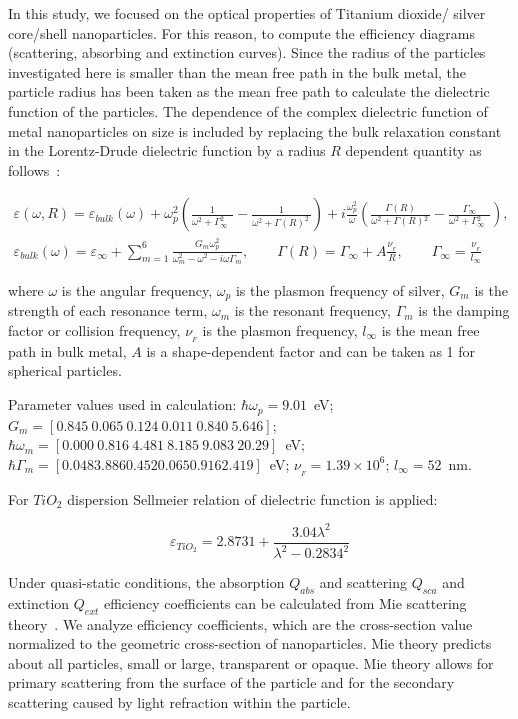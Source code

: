 \documentclass[aip,jap,reprint]{revtex4-1}
\begin{document}
In this study, we focused on the optical properties of Titanium
dioxide/ silver core/shell nanoparticles. For this reason, to compute
the efficiency diagrams (scattering, absorbing and extinction curves).
Since the radius of the particles investigated here is smaller than
the mean free path in the bulk metal, the particle radius has been
taken as the mean free path to calculate the dielectric function of
the particles. The dependence of the complex dielectric function of
metal nanoparticles on size is included by replacing the bulk
relaxation constant in the Lorentz-Drude dielectric function by a
radius $R$ dependent quantity as follows~\cite{Kreibig-1995,Rakic-1998}:
\begin{widetext}
\begin{align*}
\varepsilon(\omega,R) = \varepsilon_{bulk}(\omega) 
+ \omega^2_p
\left(
  \frac{1}{\omega^2 +{\Gamma}^2_{\infty\phantom{A}}} -
  \frac{1}{\omega^2 +\Gamma(R)^{2}_{\phantom{A}}} 
\right)
+ i \frac{\omega^2_p}{\omega}
\left (
  \frac{\Gamma(R)}{\omega^2+\Gamma(R){^2_{\phantom{A}}}}
  - \frac{\Gamma_\infty}{\omega^2+\Gamma{^{2}_{\infty\phantom{A}}}}
\right) ,\\ 
\varepsilon_{bulk}(\omega) = \varepsilon_\infty 
+ \sum^6_{m=1} \frac{G_m \omega^2_p}{\omega_m^2 - \omega^2 -i \omega
  \Gamma_m} , \qquad
  \Gamma(R) = \Gamma_\infty + A\frac{\nu_{\! _F}}{R}, \qquad
  \Gamma_\infty = \frac{\nu_{\! _F}}{l_\infty}
\end{align*}
\end{widetext}
where $\omega$
is the angular frequency, $\omega_p$
is the plasmon frequency of silver, $G_m$
is the strength of each resonance term, $\omega_m$
is the resonant frequency, $\Gamma_m$
is the damping factor or collision frequency, $\nu_{\! _F}$
is the plasmon frequency, $l_\infty$
is the mean free path in bulk metal, $A$
is a shape-dependent factor and can be taken as 1 for spherical
particles.

Parameter values used in calculation: $\hbar\omega_p = 9.01$~eV;
$G_m = [0.845\ 0.065\ 0.124\ 0.011\ 0.840\ 5.646]$; 
$\hbar\omega_m = [0.000\ 0.816\ 4.481\ 8.185\ 9.083\ 20.29]$~eV;
$\hbar\Gamma_m = [0.048 3.886 0.452 0.065 0.916 2.419]$~eV;
$\nu_{\! _F} = 1.39 \times 10^6$; $l_\infty = 52$~nm.

For $TiO_2$ dispersion Sellmeier relation of dielectric function is
applied: 

$$
\varepsilon_{TiO_2} = 2.8731 + \frac{3.04\lambda^2}{\lambda^2-0.2834^2}
$$

Under quasi-static conditions, the absorption $Q_{abs}$ and scattering $Q_{sca}$
and extinction $Q_{ext}$ efficiency coefficients can be calculated from Mie
scattering theory~\cite{Hulst-1957}. We analyze efficiency coefficients, which are
the cross-section value normalized to the geometric cross-section of
nanoparticles. Mie theory predicts about all particles, small or large,
transparent or opaque. Mie theory allows for primary scattering from
the surface of the particle and for the secondary scattering caused by
light refraction within the particle.
\end{document}
